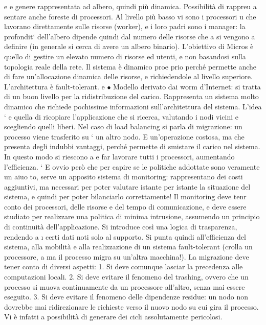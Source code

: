 \documentclass[a4paper,12pt]{article}
\begin{document}
e
e
genere rappresentata ad albero, quindi più dinamica. Possibilità di rappreu
a
sentare anche foreste di processori. Al livello più basso vi sono i processori
u
che lavorano direttamente sulle risorse (worker), e i loro padri sono i manager: la profondit` dell'albero dipende
quindi dal numero delle risorse che
a
si vengono a definire (in generale si cerca di avere un albero binario). L'obiettivo di Micros è quello di gestire un
elevato numero di risorse ed utenti,
e
non basandosi sulla topologia reale della rete. Il sistema è dinamico proe
prio perché permette anche di fare un'allocazione dinamica delle risorse,
e
richiedendole al livello superiore. L'architettura è fault-tolerant.
e
$\bullet$ Modello derivato dai worm d'Internet: si tratta di un buon livello per
la ridistribuzione del carico. Rappresenta un sistema molto dinamico che
richiede pochissime informazioni sull'architettura del sistema. L'idea `
e
quella di ricopiare l'applicazione che si ricerca, valutando i nodi vicini e
scegliendo quelli liberi.
Nel caso di load balancing si parla di migrazione: un processo viene trasferito su
`
un altro nodo. E un'operazione costosa, ma che presenta degli indubbi vantaggi,
perché permette di smistare il carico nel sistema. In questo modo si riescono a
e
far lavorare tutti i processori, aumentando l'efficienza.
`
E ovvio però che per capire se le politiche addottate sono veramente un aiuo
to, serve un apposito sistema di monitoring: rappresentano dei costi aggiuntivi,
ma necessari per poter valutare istante per istante la situazione del sistema, e
quindi per poter bilanciarlo correttamente! Il monitoring deve tenr conto dei
processori, delle risorse e del tempo di comunicazione, e deve essere studiato per
realizzare una politica di minima intrusione, assumendo un principio di continuità dell'applicazione. Si introduce così
una logica di trasparenza, rendendo
a
\i{}
certi dati noti solo al supporto. Si punta quindi all'efficienza del sistema, alla
mobilità e alla realizzazione di un sistema fault-tolerant (crolla un processore,
a
ma il processo migra su un'altra macchina!).
La migrazione deve tener conto di diversi aspetti:
1. Si deve comunque lasciar la precedenza alle computazioni locali.
2. Si deve evitare il fenomeno del trashing, ovvero che un processo si muova
continuamente da un processore all'altro, senza mai essere eseguito.
3. Si deve evitare il fenomeno delle dipendenze residue: un nodo non dovrebbe
mai ridirezionare le richieste verso il nuovo nodo su cui gira il processo.
Vi è infatti a possibilità di generare dei cicli assolutamente pericolosi.
\end{document}
